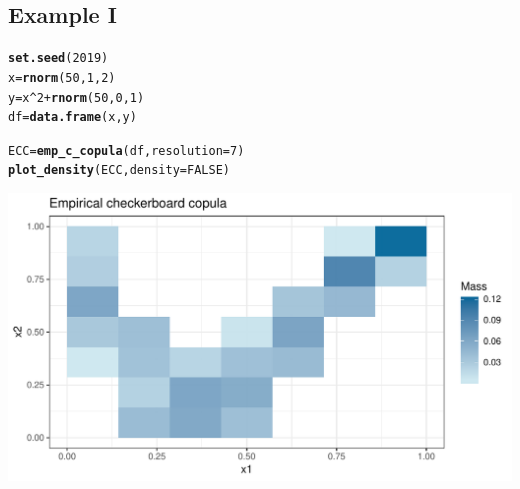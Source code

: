 \documentclass{scrartcl}\usepackage[]{graphicx}\usepackage[]{color}
\makeatletter
\def\maxwidth{ %
  \ifdim\Gin@nat@width>\linewidth
    \linewidth
  \else
    \Gin@nat@width
  \fi
}
\newcommand{\hlnum}[1]{\textcolor[rgb]{0.686,0.059,0.569}{#1}}%
\newcommand{\hlopt}[1]{\textcolor[rgb]{0,0,0}{#1}}%
\newcommand{\hlstd}[1]{\textcolor[rgb]{0.345,0.345,0.345}{#1}}%
\newcommand{\hlkwb}[1]{\textcolor[rgb]{0.69,0.353,0.396}{#1}}%
\newcommand{\hlkwc}[1]{\textcolor[rgb]{0.333,0.667,0.333}{#1}}%
\newcommand{\hlkwd}[1]{\textcolor[rgb]{0.737,0.353,0.396}{\textbf{#1}}}%
\newenvironment{kframe}{%
 \def\at@end@of@kframe{}%
 \ifinner\ifhmode%
  \def\at@end@of@kframe{\end{minipage}}%
  \begin{minipage}{\columnwidth}%
 \fi\fi%
 \def\FrameCommand##1{\hskip\@totalleftmargin \hskip-\fboxsep
 \colorbox{shadecolor}{##1}\hskip-\fboxsep
     \hskip-\linewidth \hskip-\@totalleftmargin \hskip\columnwidth}%
 \MakeFramed {\advance\hsize-\width
   \@totalleftmargin\z@ \linewidth\hsize
   \@setminipage}}%
 {\par\unskip\endMakeFramed%
 \at@end@of@kframe}
\newenvironment{knitrout}{}{} %
\makeatother
\begin{document}
\subsection{Example I}
\begin{knitrout}
\color{fgcolor}\begin{kframe}
\begin{alltt}
\hlkwd{set.seed}\hlstd{(}\hlnum{2019}\hlstd{)}
\hlstd{x} \hlkwb{=} \hlkwd{rnorm}\hlstd{(}\hlnum{50}\hlstd{,}\hlnum{1}\hlstd{,}\hlnum{2}\hlstd{)}
\hlstd{y} \hlkwb{=} \hlstd{x}\hlopt{^}\hlnum{2} \hlopt{+} \hlkwd{rnorm}\hlstd{(}\hlnum{50}\hlstd{,}\hlnum{0}\hlstd{,}\hlnum{1}\hlstd{)}
\hlstd{df} \hlkwb{=} \hlkwd{data.frame}\hlstd{(x,y)}

\hlstd{ECC} \hlkwb{=} \hlkwd{emp_c_copula}\hlstd{(df,} \hlkwc{resolution} \hlstd{=} \hlnum{7}\hlstd{)}
\hlkwd{plot_density}\hlstd{(ECC,}\hlkwc{density}\hlstd{=}\hlnum{FALSE}\hlstd{)}
\end{alltt}
\end{kframe}
\includegraphics[width=\maxwidth]{figure/unnamed-chunk-5-1} 

\end{knitrout}
\end{document}
